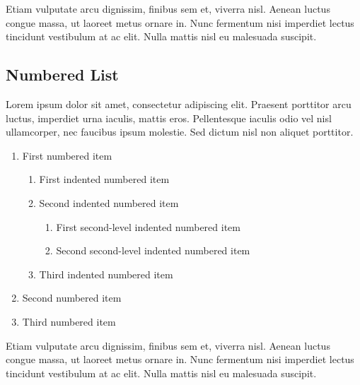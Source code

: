\documentclass[
	a4paper, %
	11pt, %
]{DC_Report}
\begin{document}
Etiam vulputate arcu dignissim, finibus sem et, viverra nisl. Aenean luctus congue massa, ut laoreet metus ornare in. Nunc fermentum nisi imperdiet lectus tincidunt vestibulum at ac elit. Nulla mattis nisl eu malesuada suscipit.


\subsection{Numbered List}

Lorem ipsum dolor sit amet, consectetur adipiscing elit. Praesent porttitor arcu luctus, imperdiet urna iaculis, mattis eros. Pellentesque iaculis odio vel nisl ullamcorper, nec faucibus ipsum molestie. Sed dictum nisl non aliquet porttitor.

\begin{enumerate}
	\item First numbered item
	\begin{enumerate}
		\item First indented numbered item
		\item Second indented numbered item
		\begin{enumerate}
			\item First second-level indented numbered item
			\item Second second-level indented numbered item
		\end{enumerate}
		\item Third indented numbered item
	\end{enumerate}
	\item Second numbered item
	\item Third numbered item
\end{enumerate}

Etiam vulputate arcu dignissim, finibus sem et, viverra nisl. Aenean luctus congue massa, ut laoreet metus ornare in. Nunc fermentum nisi imperdiet lectus tincidunt vestibulum at ac elit. Nulla mattis nisl eu malesuada suscipit.
\end{document}
